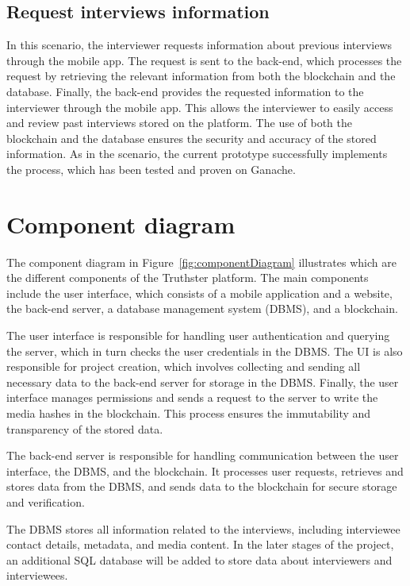 \documentclass[target=mst,aauheader=]{thud}
\begin{document}
\subsection{Request interviews information}
\label{requestInterviewsInformation}

In this scenario, the interviewer requests information about previous interviews through the mobile app. The request is sent to the back-end, which processes the request by retrieving the relevant information from both the blockchain and the database. Finally, the back-end provides the requested information to the interviewer through the mobile app. This allows the interviewer to easily access and review past interviews stored on the platform. The use of both the blockchain and the database ensures the security and accuracy of the stored information. As in the  scenario, the current prototype successfully implements the process, which has been tested and proven on Ganache.

\section{Component diagram}

The component diagram in Figure~\ref{fig:componentDiagram} illustrates which are the different components of the Truthster platform. The main components include the user interface, which consists of a mobile application and a website, the back-end server, a database management system (DBMS), and a blockchain.


The user interface is responsible for handling user authentication and querying the server, which in turn checks the user credentials in the DBMS. The UI is also responsible for project creation, which involves collecting and sending all necessary data to the back-end server for storage in the DBMS. Finally, the user interface manages permissions and sends a request to the server to write the media hashes in the blockchain. This process ensures the immutability and transparency of the stored data.

The back-end server is responsible for handling communication between the user interface, the DBMS, and the blockchain. It processes user requests, retrieves and stores data from the DBMS, and sends data to the blockchain for secure storage and verification.

The DBMS stores all information related to the interviews, including interviewee contact details, metadata, and media content. In the later stages of the project, an additional SQL database will be added to store data about interviewers and interviewees.
\end{document}
